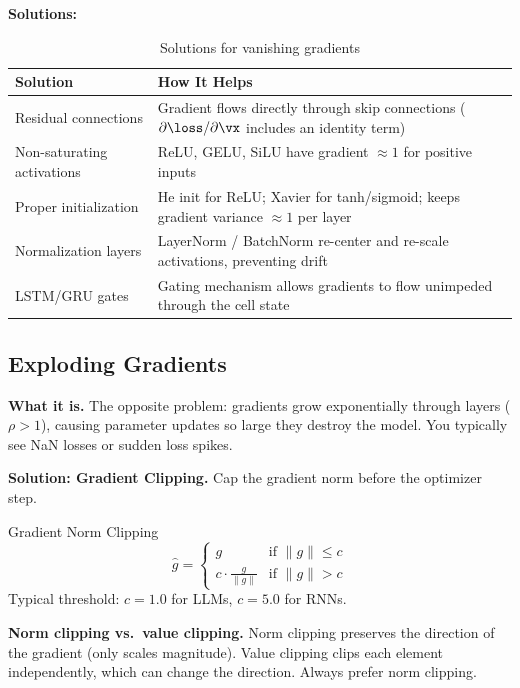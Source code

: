 \textbf{Solutions:}

\begin{table}[H]
\centering
\caption{Solutions for vanishing gradients}
\begin{tabularx}{\textwidth}{lX}
\toprule
\textbf{Solution} & \textbf{How It Helps} \\
\midrule
Residual connections & Gradient flows directly through skip connections ($\partial \loss / \partial \vx$ includes an identity term) \\
Non-saturating activations & ReLU, GELU, SiLU have gradient $\approx 1$ for positive inputs \\
Proper initialization & He init for ReLU; Xavier for tanh/sigmoid; keeps gradient variance $\approx 1$ per layer \\
Normalization layers & LayerNorm / BatchNorm re-center and re-scale activations, preventing drift \\
LSTM/GRU gates & Gating mechanism allows gradients to flow unimpeded through the cell state \\
\bottomrule
\end{tabularx}
\end{table}

\subsection{Exploding Gradients}

\textbf{What it is.} The opposite problem: gradients grow exponentially through layers ($\rho > 1$), causing parameter updates so large they destroy the model. You typically see NaN losses or sudden loss spikes.

\textbf{Solution: Gradient Clipping.} Cap the gradient norm before the optimizer step.

\begin{mathresult}{Gradient Norm Clipping}
\begin{equation}
\hat{g} = \begin{cases}
g & \text{if } \|g\| \leq c \\
c \cdot \frac{g}{\|g\|} & \text{if } \|g\| > c
\end{cases}
\end{equation}
Typical threshold: $c = 1.0$ for LLMs, $c = 5.0$ for RNNs.
\end{mathresult}

\textbf{Norm clipping vs.\ value clipping.} Norm clipping preserves the direction of the gradient (only scales magnitude). Value clipping clips each element independently, which can change the direction. Always prefer norm clipping.

